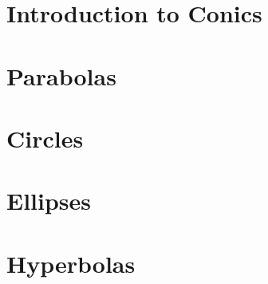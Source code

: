 \section{Introduction to Conics}



\newpage

\section{Parabolas}



\newpage

\section{Circles}



\newpage

\section{Ellipses}



\newpage

\section{Hyperbolas}

